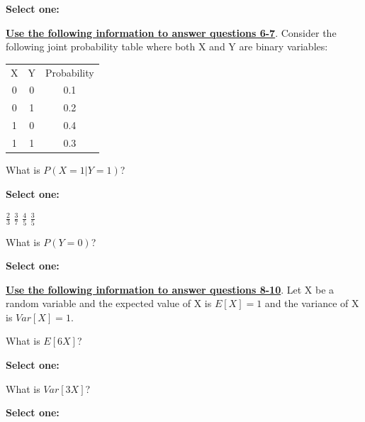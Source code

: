 \documentclass[11pt,addpoints,answers]{exam}
\numberwithin{equation}{section} %
\numberwithin{figure}{section} %
\numberwithin{table}{section} %
\begin{document}
\begin{questions}
    \textbf{Select one:}
    \begin{checkboxes}
    \end{checkboxes}

    
    \bigskip
    
    \textbf{\underline{Use the following information to answer questions 6-7}}. Consider the following joint probability table where both X and Y are binary variables:\\[12pt] 
    \begin{tabular}{ccc}
    X & Y & Probability \\
    0 & 0 & 0.1\\
    0 & 1 & 0.2\\
    1 & 0 & 0.4\\
    1 & 1 & 0.3
    \end{tabular}


    \question[1] What is $P(X = 1 | Y=1)$?

    \textbf{Select one:}
    \begin{checkboxes}
        \choice $\frac{2}{3}$
        \choice $\frac{3}{7}$
        \choice $\frac{4}{5}$
        \choice $\frac{3}{5}$
    \end{checkboxes}


    \question[1] What is $P(Y=0)$?

    \textbf{Select one:}
    \begin{checkboxes}
    \end{checkboxes}

    
    
    \clearpage
    \textbf{\underline{Use the following information to answer questions 8-10}}. Let X be a random variable and the expected value of X is $E[X] = 1$ and the variance of X is $Var[X] = 1$. 

    \question[1] What is $E[6X]$?

    \textbf{Select one:}
    \begin{checkboxes}
    \end{checkboxes}


    \question[1] What is $Var[3X]$?

    \textbf{Select one:}
    \begin{checkboxes}
    \end{checkboxes}



\end{questions}
\end{document}
